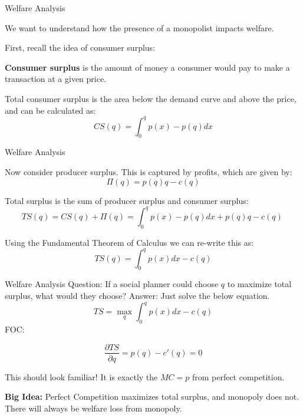 \documentclass[aspectratio=169]{beamer}
\newenvironment{wideitemize}{\itemize\addtolength{\itemsep}{10pt}}{\enditemize}
\begin{document}
\begin{frame}{Welfare Analysis}
\begin{wideitemize}
        \item We want to understand how the presence of a monopolist impacts welfare.
        \item First, recall the idea of consumer surplus:
        \begin{definition}
            \textbf{Consumer surplus} is the amount of money a consumer would pay to make a transaction at a given price.
        \end{definition}
        \item Total consumer surplus is the area below the demand curve and above the price, and can be calculated as:
        \[CS(q) = \int^q_0 p(x) - p(q)dx \]
\end{wideitemize}
    
\end{frame}
\begin{frame}{Welfare Analysis}
\begin{wideitemize}
        \item Now consider producer surplus. This is captured by profits, which are given by:
        \[\Pi(q) = p(q) q - c(q)\]
        \item Total surplus is the sum of producer surplus and consumer surplus:
        \[TS(q) = CS(q)+\Pi(q) = \int^q_0 p(x) - p(q)dx+p(q) q - c(q)\  \]
        \item Using the Fundamental Theorem of Calculus we can re-write this as:
        \[TS(q) = \int^q_0 p(x) dx- c(q)  \]
\end{wideitemize}
    
\end{frame}

\begin{frame}{Welfare Analysis}
Question: If a social planner could choose $q$ to maximize total surplus, what would they choose?
Answer: Just solve the below equation.
\[TS = \max_q \int^q_0 p(x) dx- c(q)\]
FOC: 

\[\frac{\partial TS}{\partial q} = p(q)-c'(q)=0\]

This should look familiar! It is exactly the $MC=p$ from perfect competition.

\vspace{5mm}

\textbf{Big Idea:} Perfect Competition maximizes total surplus, and monopoly does not. There will always be welfare loss from monopoly.

\end{frame}
\end{document}
